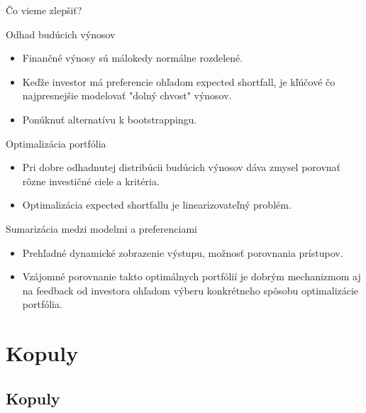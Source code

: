 \documentclass{Bredelebeamer}
\begin{document}
\begin{frame}{Čo vieme zlepšiť?}
	\begin{block}{Odhad budúcich výnosov}
		\begin{itemize}
			\item Finančné výnosy sú málokedy normálne rozdelené.
			\item Keďže investor má preferencie ohľadom expected shortfall, je kľúčové čo najpresnejšie modelovať "dolný chvost" výnosov.
			\item Ponúknuť alternatívu k bootstrappingu.
		\end{itemize}
	\end{block}
	
	\pause\begin{block}{Optimalizácia portfólia}
		\begin{itemize}
			\item Pri dobre odhadnutej distribúcii budúcich výnosov dáva zmysel porovnať rôzne investičné ciele a kritéria.
			\item Optimalizácia expected shortfallu je linearizovateľný problém.
		\end{itemize}
	\end{block}
	
	\pause\begin{block}{Sumarizácia medzi modelmi a preferenciami}
		\begin{itemize}
			\item Prehľadné dynamické zobrazenie výstupu, možnosť porovnania prístupov.
			\item Vzájomné porovnanie takto optimálnych portfólií je dobrým mechanizmom aj na feedback od investora ohľadom výberu konkrétneho spôsobu optimalizácie portfólia.
		\end{itemize}
	\end{block}

\end{frame}

\section{Kopuly}
\subsection{Kopuly}
\end{document}
